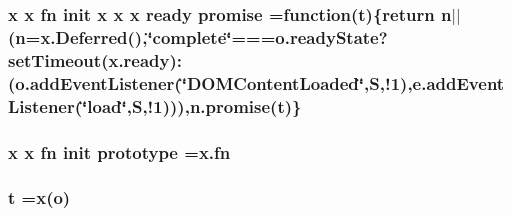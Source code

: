 \hypertarget{jquery-2_80_83_8min_8js_ae956a9bca3451b56c70176dc10299813}{
\subsubsection[{promise}]{\setlength{\rightskip}{0pt plus 5cm}x x {\bf fn} init x x x {\bf ready} promise =function({\bf t})\{return n$\vert$$\vert$(n=x.\-Deferred(),\char`\"{}complete\char`\"{}===o.\-ready\-State?set\-Timeout({\bf x.\-ready})\-:(o.\-add\-Event\-Listener(\char`\"{}D\-O\-M\-Content\-Loaded\char`\"{},S,!1),e.\-add\-Event\-Listener(\char`\"{}load\char`\"{},S,!1))),n.\-promise({\bf t})\}}}\label{jquery-2_80_83_8min_8js_ae956a9bca3451b56c70176dc10299813}
\hypertarget{jquery-2_80_83_8min_8js_a0288e63a1ed58706e175fa8fbd67d19b}{
\subsubsection[{prototype}]{\setlength{\rightskip}{0pt plus 5cm}x x {\bf fn} init prototype ={\bf x.\-fn}}}\label{jquery-2_80_83_8min_8js_a0288e63a1ed58706e175fa8fbd67d19b}
\hypertarget{jquery-2_80_83_8min_8js_aaccc9105df5383111407fd5b41255e23}{
\subsubsection[{t}]{\setlength{\rightskip}{0pt plus 5cm}t =x(o)}}\label{jquery-2_80_83_8min_8js_aaccc9105df5383111407fd5b41255e23}
